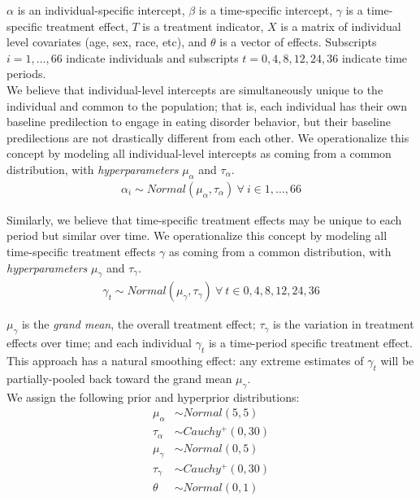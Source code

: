 \documentclass[12pt, oneside]{article}
\begin{document}
$\alpha$ is an individual-specific intercept, $\beta$ is a time-specific intercept, $\gamma$ is a time-specific treatment effect, $T$ is a treatment indicator, $X$ is a matrix of individual level covariates (age, sex, race, etc), and $\theta$ is a vector of effects. Subscripts $i = 1, ..., 66$ indicate individuals and subscripts $t = 0, 4, 8, 12, 24, 36$ indicate time periods.
\\

We believe that individual-level intercepts are simultaneously unique to the individual and common to the population; that is, each individual has their own baseline predilection to engage in eating disorder behavior, but their baseline predilections are not drastically different from each other.  We operationalize this concept by modeling all individual-level intercepts as coming from a common distribution, with \emph{hyperparameters} $\mu_{\alpha}$ and $\tau_{\alpha}$.
\begin{align}
\alpha_i \sim Normal(\mu_{\alpha}, \tau_{\alpha}) \ \forall \ i \in 1,...,66
\end{align} 

Similarly, we believe that time-specific treatment effects may be unique to each period but similar over time. We operationalize this concept by modeling all time-specific treatment effects $\gamma$ as coming from a common distribution, with \emph{hyperparameters} $\mu_{\gamma}$ and $\tau_{\gamma}$.
\begin{align}
\gamma_t \sim Normal(\mu_{\gamma}, \tau_{\gamma}) \ \forall \ t \in 0, 4, 8, 12, 24, 36
\end{align} 

$\mu_{\gamma}$ is the \emph{grand mean}, the overall treatment effect; $\tau_{\gamma}$ is the variation in treatment effects over time; and each individual $\gamma_t$ is a time-period specific treatment effect.  This approach has a natural smoothing effect: any extreme estimates of $\gamma_t$ will be partially-pooled back toward the grand mean $\mu_{\gamma}$.
\\

We assign the following prior and hyperprior distributions:
\begin{align}
\mu_{\alpha} &\sim Normal(5, 5) \\
\tau_{\alpha} &\sim Cauchy^+(0, 30) \\
\mu_{\gamma} &\sim Normal(0, 5) \\
\tau_{\gamma} &\sim Cauchy^+(0, 30) \\
\theta &\sim Normal(0, 1) \\
\end{align}
\end{document}
